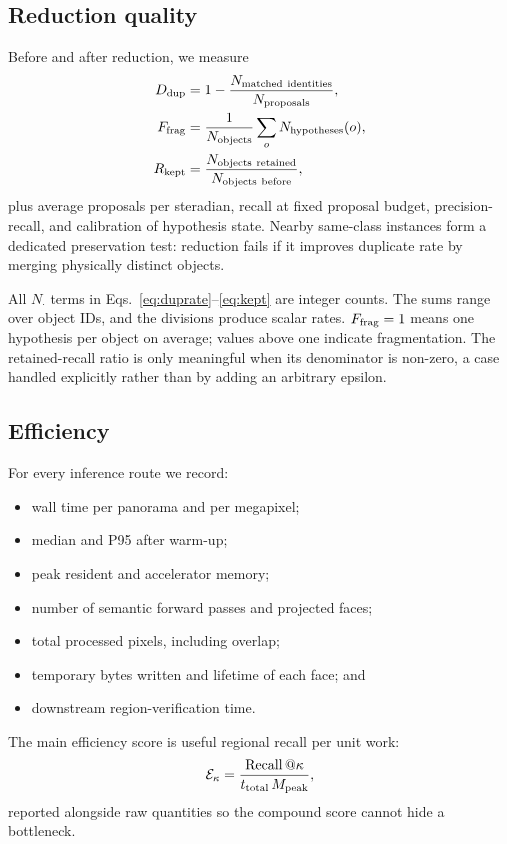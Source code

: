 \documentclass[a4paper,9pt]{extarticle}
\begin{document}
\subsection{Reduction quality}

Before and after reduction, we measure
\begin{align}
 D_{\rm dup}&=1-\frac{N_{\rm matched\ identities}}{N_{\rm proposals}}, \label{eq:duprate}\\
 F_{\rm frag}&=\frac{1}{N_{\rm objects}}\sum_o N_{\rm hypotheses}(o), \label{eq:frag}\\
 R_{\rm kept}&=\frac{N_{\rm objects\ retained}}{N_{\rm objects\ before}}, \label{eq:kept}
\end{align}
plus average proposals per steradian, recall at fixed proposal budget, precision-recall, and calibration of hypothesis state. Nearby same-class instances form a dedicated preservation test: reduction fails if it improves duplicate rate by merging physically distinct objects.

All $N_{\cdot}$ terms in Eqs.~\ref{eq:duprate}--\ref{eq:kept} are integer
counts. The sums range over object IDs, and the divisions produce scalar rates.
$F_{\rm frag}=1$ means one hypothesis per object on average; values above one
indicate fragmentation. The retained-recall ratio is only meaningful when its
denominator is non-zero, a case handled explicitly rather than by adding an
arbitrary epsilon.

\subsection{Efficiency}

For every inference route we record:
\begin{itemize}
 \item wall time per panorama and per megapixel;
 \item median and P95 after warm-up;
 \item peak resident and accelerator memory;
 \item number of semantic forward passes and projected faces;
 \item total processed pixels, including overlap;
 \item temporary bytes written and lifetime of each face; and
 \item downstream region-verification time.
\end{itemize}
The main efficiency score is useful regional recall per unit work:
\begin{equation}
 \mathcal E_\kappa=
 \frac{\operatorname{Recall}@\kappa}
 {t_{\rm total}\,M_{\rm peak}},
 \label{eq:efficiency}
\end{equation}
reported alongside raw quantities so the compound score cannot hide a bottleneck.
\end{document}
